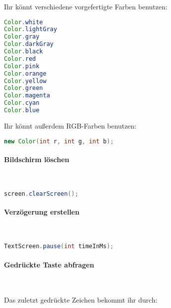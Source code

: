 \documentclass[12pt,a4paper]{article}
\begin{document}
Ihr könnt verschiedene vorgefertigte Farben benutzen:

\begin{tcolorbox}[frame empty,nobeforeafter,colback=gray!5]
\begin{lstlisting}[language=java,basicstyle=\ttfamily]
Color.white
Color.lightGray
Color.gray
Color.darkGray
Color.black
Color.red
Color.pink
Color.orange
Color.yellow
Color.green
Color.magenta
Color.cyan
Color.blue
\end{lstlisting}
\end{tcolorbox}

Ihr könnt außerdem RGB-Farben benutzen:

\begin{tcolorbox}[frame empty,nobeforeafter,colback=gray!5]
\begin{lstlisting}[language=java,basicstyle=\ttfamily]
new Color(int r, int g, int b);
\end{lstlisting}
\end{tcolorbox}

\paragraph{Bildschirm löschen}\

\begin{tcolorbox}[frame empty,nobeforeafter,colback=gray!5]
\begin{lstlisting}[language=java,basicstyle=\ttfamily]
screen.clearScreen();
\end{lstlisting}
\end{tcolorbox}

\paragraph{Verzögerung erstellen}\

\begin{tcolorbox}[frame empty,nobeforeafter,colback=gray!5]
\begin{lstlisting}[language=java,basicstyle=\ttfamily]
TextScreen.pause(int timeInMs);
\end{lstlisting}
\end{tcolorbox}

\paragraph{Gedrückte Taste abfragen}\

Das zuletzt gedrückte Zeichen bekommt ihr durch:
\end{document}
